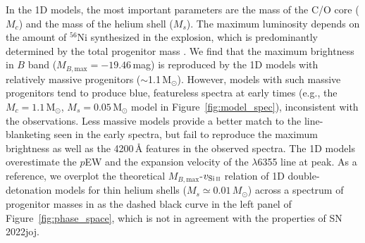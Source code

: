\documentclass[twocolumn]{aastex631}
\newcommand{\sn}{SN\,2022joj}
\begin{document}
\begin{CJK*}{UTF8}{gbsn}
In the 1D models, the most important parameters are the mass of the C/O core ($M_c$) and the mass of the helium shell ($M_s$). The maximum luminosity depends on the amount of $^{56}$Ni synthesized in the explosion, which is predominantly determined by the total progenitor mass \citep[$M_c+M_s$;][]{polin_observational_2019}. We find that the maximum brightness in $B$ band ($M_{B,\mathrm{max}}=-19.46$\,mag) is reproduced by the 1D models with relatively massive progenitors ($\sim$1.1\,$\mathrm{M_\odot}$). However, models with such massive progenitors tend to produce blue, featureless spectra at early times (e.g., the $M_c=1.1\,\mathrm{M_\odot}$, $M_s=0.05\,\mathrm{M_\odot}$ model in Figure~\ref{fig:model_spec}), inconsistent with the observations. Less massive models provide a better match to the line-blanketing seen in the early spectra, but fail to reproduce the maximum brightness as well as the 4200\,\r{A} features in the observed spectra. The 1D models overestimate the $p$EW and the expansion velocity of the  $\lambda$6355 line at peak. As a reference, we overplot the theoretical $M_{B,\mathrm{max}}$-$v_\mathrm{Si\,\textsc{ii}}$ relation of 1D double-detonation models for thin helium shells ($M_s \simeq 0.01\,M_\odot$) across a spectrum of progenitor masses in \citet{polin_observational_2019} as the dashed black curve in the left panel of Figure~\ref{fig:phase_space}, which is not in agreement with the properties of \sn.


\end{CJK*}
\end{document}
